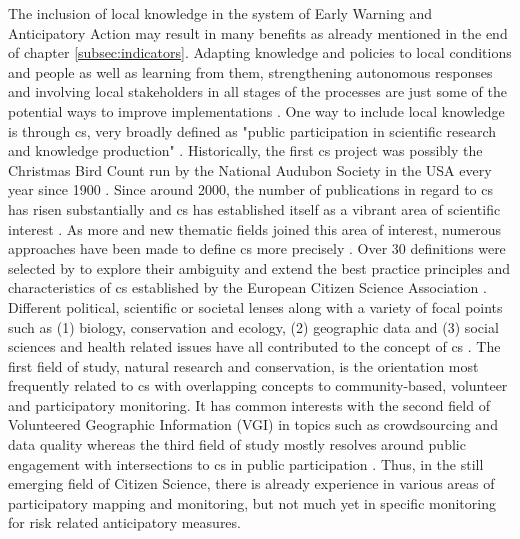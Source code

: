 The inclusion of local knowledge in the system of Early Warning and Anticipatory Action may result in many benefits as already mentioned in the end of chapter \ref{subsec:indicators}. Adapting knowledge and policies to local conditions and people as well as learning from them, strengthening autonomous responses and involving local stakeholders in all stages of the processes are just some of the potential ways to improve implementations \autocite{giordanoIntegrationLocalScientific2013a,idmpDroughtWaterScarcity2022,lackstromBackyardHydroclimatologyCitizen2022,lealfilhoRoleIndigenousKnowledge2022,lealfilhoUnderstandingResponsesClimaterelated2022}. One way to include local knowledge is through \acrfull{cs}, very broadly defined as "public participation in scientific research and knowledge production" \autocite[1]{fraislCitizenScienceEnvironmental2022}.\newline
Historically, the first \acrlong{cs} project was possibly the Christmas Bird Count run by the National Audubon Society in the USA every year since 1900 \autocite{linkHierarchicalModelRegional2006,silvertownNewDawnCitizen2009}. Since around 2000, the number of publications in regard to \acrshort{cs} has risen substantially and \acrshort{cs} has established itself as a vibrant area of scientific interest \autocite{kirschkeCitizenScienceProjects2022}. As more and new thematic fields joined this area of interest, numerous approaches have been made to define \acrshort{cs} more precisely \autocite{haklayWhatCitizenScience2021}.\newline
Over 30 definitions were selected by \textcite{haklayWhatCitizenScience2021} to explore their ambiguity and extend the best practice principles and characteristics of \acrshort{cs} established by the European Citizen Science Association \autocite{escaTenPrinciplesCitizen2015,escaECSACharacteristicsCitizen2020}. Different political, scientific or societal lenses along with a variety of focal points such as (1) biology, conservation and ecology, (2) geographic data and (3) social sciences and health related issues have all contributed to the concept of \acrlong{cs} \autocite{haklayWhatCitizenScience2021,kirschkeCitizenScienceProjects2022}. The first field of study, natural research and conservation, is the orientation most frequently related to \acrshort{cs} with overlapping concepts to community-based, volunteer and participatory monitoring. It has common interests with the second field of Volunteered Geographic Information (VGI) in topics such as crowdsourcing and data quality whereas the third field of study mostly resolves around public engagement with intersections to \acrshort{cs} in public participation \autocite{kullenbergWhatCitizenScience2016}. Thus, in the still emerging field of Citizen Science, there is already experience in various areas of participatory mapping and monitoring, but not much yet in specific monitoring for risk related anticipatory measures.

